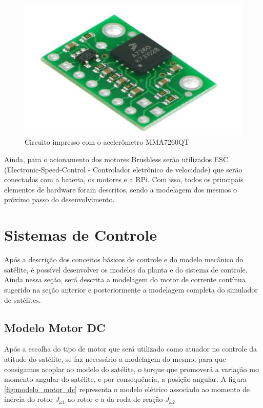 \begin{figure}[H]
  \caption{Circuito impresso com o acelerômetro MMA7260QT}
  \begin{center}
      \includegraphics[scale=.4]{metodologia/img/pci_acelerometro_calache_p22}
  \end{center}
  \label{fig:pci_acelerometro_calache_p22}
\end{figure}

Ainda, para o acionamento dos motores Brushless serão utilizados ESC (Electronic-Speed-Control - Controlador eletrônico de velocidade) que serão conectados com a bateria, os motores e a RPi. Com isso, todos os principais elementos de hardware foram descritos, sendo a modelagem dos mesmos o próximo passo do desenvolvimento.


\section{Sistemas de Controle}

Após a descrição dos conceitos básicos de controle e do modelo mecânico do satélite, é possível desenvolver os modelos da planta e do sistema de controle. Ainda nessa seção, será descrita a modelagem do motor de corrente contínua sugerido na seção anterior e posteriormente a modelagem completa do simulador de satélites.

\subsection{Modelo Motor DC}

Após a escolha do tipo de motor que será utilizado como atuador no controle da atitude do satélite, se faz necessário a modelagem do mesmo, para que consigamos acoplar ao modelo do satélite, o torque que promoverá a variação mo momento angular do satélite, e por consequência, a posição angular. A figura \ref{fig:modelo_motor_dc} representa o modelo elétrico associado ao momento de inércia do rotor $J_{\omega 1}$ ao rotor e a da roda de reação $J_{\omega 2}$

